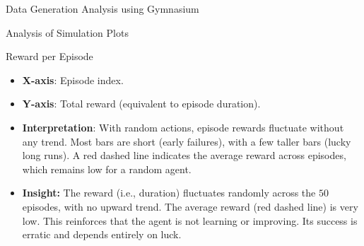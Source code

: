\begin{frame}[fragile]{Data Generation Analysis using Gymnasium}
\begin{block}{Analysis of Simulation Plots}
\begin{block}{Reward per Episode}
\begin{itemize}
\item
  \textbf{X-axis}: Episode index.
\item
  \textbf{Y-axis}: Total reward (equivalent to episode duration).
\item
  \textbf{Interpretation}: With random actions, episode rewards
  fluctuate without any trend. Most bars are short (early failures),
  with a few taller bars (lucky long runs). A red dashed line indicates
  the average reward across episodes, which remains low for a random
  agent.
\item
  \textbf{Insight:} The reward (i.e., duration) fluctuates randomly
  across the \(50\) episodes, with no upward trend. The average reward
  (red dashed line) is very low. This reinforces that the agent is not
  learning or improving. Its success is erratic and depends entirely on
  luck.
\end{itemize}
\end{block}
\end{block}
\end{frame}

